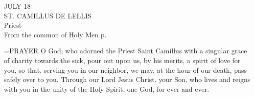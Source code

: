 \begin{center}\normalsize JULY 18\\
\footnotesize ST. CAMILLUS DE LELLIS\\
\footnotesize Priest\\
\footnotesize From the common of Holy Men p. \\
\end{center}

\hangindent=\parindent \small{PRAYER 
O God, who adorned the Priest Saint Camillus
with a singular grace of charity towards the sick,
pour out upon us, by his merits,
a spirit of love for you,
so that, serving you in our neighbor,
we may, at the hour of our death,
pass safely over to you.
Through our Lord Jesus Christ, your Son, who lives and reigns with you in the unity of the Holy Spirit,
one God, for ever and ever.\\}
 
